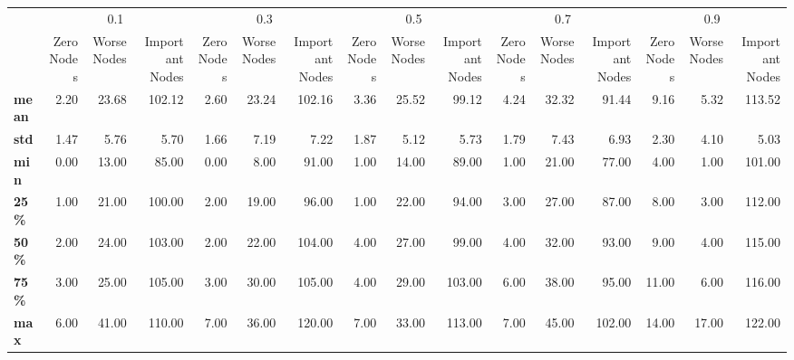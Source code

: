 \begin{tabular}{lrrrrrrrrrrrrrrr}
\toprule
{} & \multicolumn{3}{c}{0.1} & \multicolumn{3}{c}{0.3} & \multicolumn{3}{c}{0.5} & \multicolumn{3}{c}{0.7} & \multicolumn{3}{c}{0.9} \\
{} & Zero Nodes & Worse Nodes & Important Nodes & Zero Nodes & Worse Nodes & Important Nodes & Zero Nodes & Worse Nodes & Important Nodes & Zero Nodes & Worse Nodes & Important Nodes & Zero Nodes & Worse Nodes & Important Nodes \\
\midrule
\textbf{mean} &       2.20 &       23.68 &          102.12 &       2.60 &       23.24 &          102.16 &       3.36 &       25.52 &           99.12 &       4.24 &       32.32 &           91.44 &       9.16 &        5.32 &          113.52 \\
\textbf{std } &       1.47 &        5.76 &            5.70 &       1.66 &        7.19 &            7.22 &       1.87 &        5.12 &            5.73 &       1.79 &        7.43 &            6.93 &       2.30 &        4.10 &            5.03 \\
\textbf{min } &       0.00 &       13.00 &           85.00 &       0.00 &        8.00 &           91.00 &       1.00 &       14.00 &           89.00 &       1.00 &       21.00 &           77.00 &       4.00 &        1.00 &          101.00 \\
\textbf{25\% } &       1.00 &       21.00 &          100.00 &       2.00 &       19.00 &           96.00 &       1.00 &       22.00 &           94.00 &       3.00 &       27.00 &           87.00 &       8.00 &        3.00 &          112.00 \\
\textbf{50\% } &       2.00 &       24.00 &          103.00 &       2.00 &       22.00 &          104.00 &       4.00 &       27.00 &           99.00 &       4.00 &       32.00 &           93.00 &       9.00 &        4.00 &          115.00 \\
\textbf{75\% } &       3.00 &       25.00 &          105.00 &       3.00 &       30.00 &          105.00 &       4.00 &       29.00 &          103.00 &       6.00 &       38.00 &           95.00 &      11.00 &        6.00 &          116.00 \\
\textbf{max } &       6.00 &       41.00 &          110.00 &       7.00 &       36.00 &          120.00 &       7.00 &       33.00 &          113.00 &       7.00 &       45.00 &          102.00 &      14.00 &       17.00 &          122.00 \\
\bottomrule
\end{tabular}
